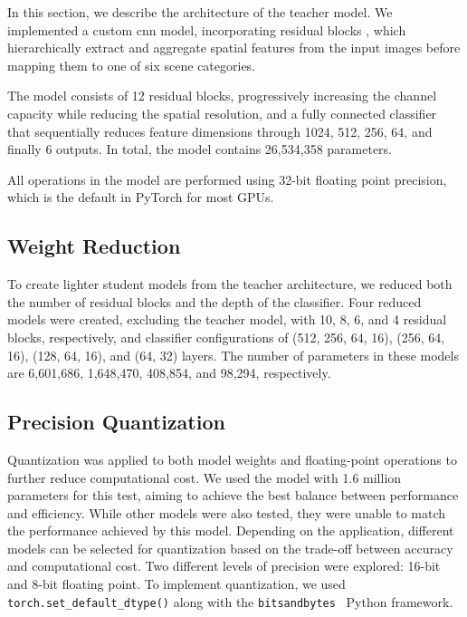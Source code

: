 In this section, we describe the architecture of the teacher model.
We implemented a custom \gls*{cnn} model, incorporating residual blocks \cite{he2016deep},
which hierarchically extract and aggregate spatial features from the input images
before mapping them to one of six scene categories.

The model consists of 12 residual blocks,
progressively increasing the channel capacity while reducing the spatial resolution,
and a fully connected classifier that sequentially reduces feature dimensions through 1024, 512, 256, 64, and finally 6 outputs.
In total, the model contains 26,534,358 parameters.

All operations in the model are performed using 32-bit floating point precision,
which is the default in PyTorch \cite{paszke2019pytorch}
for most GPUs.

\subsection{Weight Reduction}
\label{sec:method:weight_reduction}

To create lighter student models from the teacher architecture,
we reduced both the number of residual blocks and the depth of the classifier.
Four reduced models were created, excluding the teacher model,
with 10, 8, 6, and 4 residual blocks, respectively,
and classifier configurations of (512, 256, 64, 16), (256, 64, 16), (128, 64, 16), and (64, 32) layers.
The number of parameters in these models are 6,601,686, 1,648,470, 408,854, and 98,294, respectively.

\subsection{Precision Quantization}
\label{sec:method:precision_quantization}

Quantization was applied to both model weights and floating-point operations
to further reduce computational cost.
We used the model with 1.6 million parameters for this test, aiming to achieve the best balance between performance and efficiency.
While other models were also tested, they were unable to match the performance achieved by this model.
Depending on the application, different models can be selected for quantization based on the trade-off between accuracy and computational cost.
Two different levels of precision were explored: 16-bit and 8-bit floating point.
To implement quantization,
we used \texttt{torch.set\_default\_dtype()} along with the \texttt{bitsandbytes}~\cite{bitsandbytes} Python framework.
